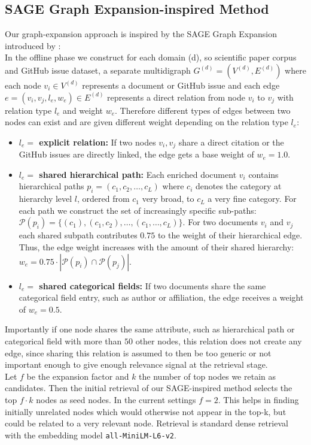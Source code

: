 \documentclass[11pt]{article}
\begin{document}
\subsection{SAGE Graph Expansion-inspired Method}
\label{subsec:SAGE}
Our graph-expansion approach is inspired by the SAGE Graph Expansion introduced by \cite{titiya_sage_2026}:\\
In the offline phase we construct for each domain (d), so scientific paper corpus and GitHub issue dataset, a separate multidigraph $G^{(d)}=(V^{(d)},E^{(d)})$ where each node $v_i\in V^{(d)}$ represents a document or GitHub issue and each edge $e=(v_i, v_j, l_e, w_e)\in E^{(d)}$ represents a direct relation from node $v_i$  to $v_j$  with relation type $l_e$ and weight $w_e$. Therefore different types of edges between two nodes can exist and are given different weight depending on the relation type $l_e$:
\begin{itemize}
    \setlength{\itemsep}{2pt}
    \setlength{\parskip}{0pt}
    \setlength{\topsep}{4pt}
    \item \textbf{$l_e=$ explicit relation: }If two nodes $v_i, v_j$ share a direct citation or the GitHub issues are directly linked, the edge gets a base weight of $w_e=1.0$.
    \item \textbf{$l_e=$ shared hierarchical path: }Each enriched document $v_i$ contains hierarchical paths $p_i=(c_1,c_2,\ldots,c_L)$ where $c_i$ denotes the category at hierarchy level $l$, ordered from $c_1$ very broad, to $c_L$ a very fine category. For each path we construct the set of increasingly specific sub-paths: $\mathcal{P}(p_i)=\{(c_1),(c_1,c_2),\ldots,(c_1,\ldots,c_L)\}$. For two documents  $v_i$ and $v_j$ each shared subpath contributes $0.75$ to the weight of their hierarchical edge. Thus, the edge weight increases with the amount of their shared hierarchy: $w_e = 0.75 \cdot
    |\mathcal{P}(p_i)\cap\mathcal{P}(p_j)|$.
    \item \textbf{$l_e=$ shared categorical fields: }If two documents share the same categorical field entry, such as author or affiliation, the edge receives a weight of $w_e=0.5$.
\end{itemize}
Importantly if one node shares the same attribute, such as hierarchical path or categorical field with more than $50$ other nodes, this relation does not create any edge, since sharing this relation is assumed to then be too generic or not important enough to give enough relevance signal at the retrieval stage.\\
Let $f$ be the expansion factor and $k$ the number of top nodes we retain as candidates. Then the initial retrieval of our SAGE-inspired method selects the top $f\cdot k$ nodes as seed nodes. In the current settings $f=2$. This helps in finding initially unrelated nodes which would otherwise not appear in the top-k, but could be related to a very relevant node. Retrieval is standard dense retrieval with the embedding model \texttt{all-MiniLM-L6-v2}.\\
\end{document}
